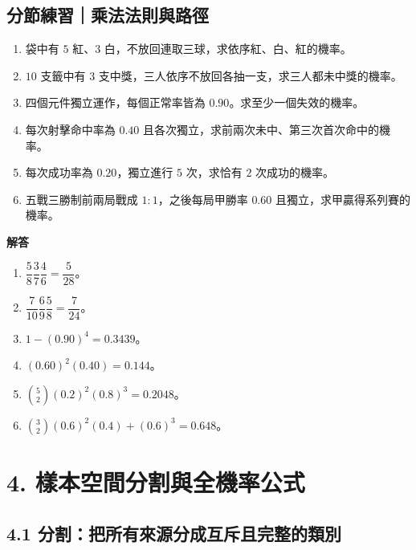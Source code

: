 \documentclass[11pt,a4paper]{article}
\providecommand{\tightlist}{%
  \setlength{\itemsep}{0pt}\setlength{\parskip}{0pt}}
\begin{document}
\begin{HandoutSelfCheck}

\subsection{分節練習｜乘法法則與路徑}\label{ux5206ux7bc0ux7df4ux7fd2ux4e58ux6cd5ux6cd5ux5247ux8207ux8defux5f91}

\begin{enumerate}
\def\labelenumi{\arabic{enumi}.}
\tightlist
\item
  袋中有 \(5\) 紅、\(3\) 白，不放回連取三球，求依序紅、白、紅的機率。
\item
  \(10\) 支籤中有 \(3\) 支中獎，三人依序不放回各抽一支，求三人都未中獎的機率。
\item
  四個元件獨立運作，每個正常率皆為 \(0.90\)。求至少一個失效的機率。
\item
  每次射擊命中率為 \(0.40\) 且各次獨立，求前兩次未中、第三次首次命中的機率。
\item
  每次成功率為 \(0.20\)，獨立進行 \(5\) 次，求恰有 \(2\) 次成功的機率。
\item
  五戰三勝制前兩局戰成 \(1:1\)，之後每局甲勝率 \(0.60\) 且獨立，求甲贏得系列賽的機率。
\end{enumerate}

\textbf{解答}

\begin{enumerate}
\def\labelenumi{\arabic{enumi}.}
\tightlist
\item
  \(\dfrac58\dfrac37\dfrac46=\boxed{\dfrac5{28}}\)。
\item
  \(\dfrac7{10}\dfrac69\dfrac58=\boxed{\dfrac7{24}}\)。
\item
  \(1-(0.90)^4=\boxed{0.3439}\)。
\item
  \((0.60)^2(0.40)=\boxed{0.144}\)。
\item
  \(\binom52(0.2)^2(0.8)^3=\boxed{0.2048}\)。
\item
  \(\binom32(0.6)^2(0.4)+(0.6)^3=\boxed{0.648}\)。
\end{enumerate}

\end{HandoutSelfCheck}

\section{4. 樣本空間分割與全機率公式}\label{ux6a23ux672cux7a7aux9593ux5206ux5272ux8207ux5168ux6a5fux7387ux516cux5f0f}

\subsection{4.1 分割：把所有來源分成互斥且完整的類別}\label{ux5206ux5272ux628aux6240ux6709ux4f86ux6e90ux5206ux6210ux4e92ux65a5ux4e14ux5b8cux6574ux7684ux985eux5225}
\end{document}

